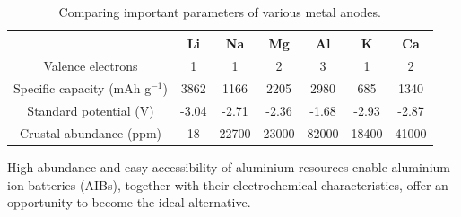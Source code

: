 \begin{table}[tbh!]
\caption{Comparing important parameters of various metal anodes.} \label{table2}
\begin{tabular}{|ccccccc|}
\hline
 & \textbf{Li} & \textbf{Na} & \textbf{Mg} & \textbf{Al} & \textbf{K} & \textbf{Ca}\\
\hline
\hline
Valence electrons & 1 & 1 & 2 & 3 & 1 & 2\\
Specific capacity (mAh g$^{-1}$) & 3862 & 1166 & 2205 & 2980 & 685 & 1340\\
Standard potential (V) & -3.04 & -2.71 & -2.36  & -1.68 & -2.93 & -2.87\\
Crustal abundance (ppm) & 18 & 22700 & 23000 & 82000 & 18400 & 41000\\
\hline  %
\end{tabular}
\end{table}

High abundance and easy accessibility of aluminium resources enable aluminium-ion batteries (AIBs), together with their electrochemical characteristics, offer an opportunity to become the ideal alternative.

